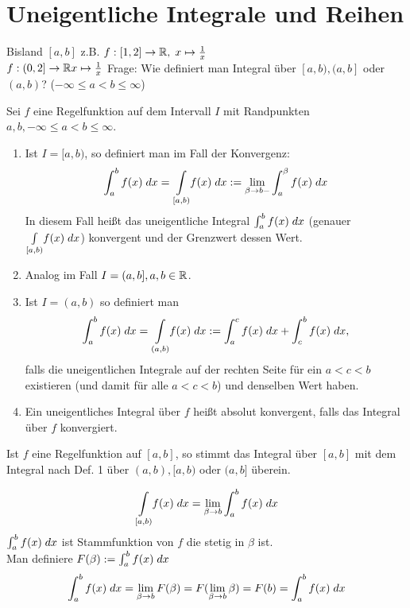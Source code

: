 \documentclass[../ana2.tex]{subfiles}
\begin{document}
\setcounter{section}{7}
\section{Uneigentliche Integrale und Reihen}
Bisland \( [a,b]  \) z.B. \( \abb{f}{[1,2]}{\R}, \;
x \mapsto \frac{1}{x} \) \\
\( \abb{f}{(0,2]}{\R} x \mapsto \frac{1}{x} \)
Frage: Wie definiert man Integral über \( [a,b), (a,b] \)
oder \( (a,b) \)? (\( -\infty \leq a < b \leq \infty \))
\begin{defi}
    Sei \(f\) eine Regelfunktion auf dem Intervall \(I\) 
    mit Randpunkten 
    \( a, b, -\infty \leq a < b \leq \infty \).
    \begin{enumerate}
        \item Ist \( I=[a,b) \), so definiert man im 
        Fall der Konvergenz:
        \[ \integral{f(x)}{a}{b} 
        = \underset{[a,b)}{\int} f(x) \dx
        := \limesx{\beta}{b-} \integral{f(x)}{a}{\beta} \]
        In diesem Fall heißt das uneigentliche Integral 
        \( \integral{f(x)}{a}{b} \) (genauer 
        \( \underset{[a,b)}{\int} f(x) \dx \)) konvergent 
        und der Grenzwert dessen Wert.    
        \item Analog im Fall \( I = (a, b], a,b \in \R \).
        \item Ist \( I =(a,b) \) so definiert man
        \[ \integral{f(x)}{a}{b} 
        = \underset{(a,b)}{\int} f(x) \dx 
        := \integral{f(x)}{a}{c} 
        + \integral{f(x)}{c}{b}, \]
        falls die uneigentlichen Integrale auf der rechten
        Seite für ein \(a < c < b\) existieren (und damit
        für alle \( a < c < b \)) und denselben Wert haben.
        \item Ein uneigentliches Integral über \(f\) 
        heißt absolut konvergent, falls das Integral 
        über \(f\) konvergiert.
    \end{enumerate}
\end{defi}
\begin{bem}
    Ist \( f \) eine Regelfunktion auf \( [a,b] \), 
    so stimmt das  Integral über 
    \( [a,b] \) mit dem  Integral nach 
    Def. 1 über \( (a,b), [a,b) \) oder \( (a,b] \) 
    überein.
\end{bem}
\begin{bew}
    \[ \underset{[a,b)}{\int} f(x) \dx = \limesx{\beta}{b} 
    \integral{f(x)}{a}{b} \]
    \( \integral{f(x)}{a}{b} \) ist Stammfunktion von \(f\) 
    die stetig in \(\beta\) ist. \\
    Man definiere \(F(\beta) := \integral{f(x)}{a}{b}\)
    \[ \integral{f(x)}{a}{b} = \limesx{\beta}{b} F(\beta)
    = F(\limesx{\beta}{b} \beta) = F(b) 
    = \integral{f(x)}{a}{b} \]    
\end{bew}
\end{document}
